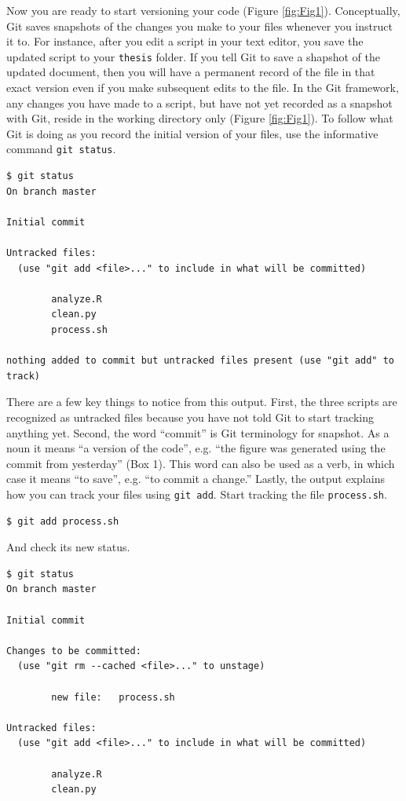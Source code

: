 \documentclass[10pt]{article}
\begin{document}
Now you are ready to start versioning your code (Figure \ref{fig:Fig1}).
Conceptually, Git saves snapshots of the changes you make to your files whenever you instruct it to.
For instance, after you edit a script in your text editor, you save the updated script to your \verb|thesis| folder.
If you tell Git to save a shapshot of the updated document, then you will have a permanent record of the file in that exact version even if you make subsequent edits to the file.
In the Git framework, any changes you have made to a script, but have not yet recorded as a snapshot with Git, reside in the working directory only (Figure \ref{fig:Fig1}).
To follow what Git is doing as you record the initial version of your files, use the informative command \verb|git status|.

\begin{verbatim}
$ git status
On branch master

Initial commit

Untracked files:
  (use "git add <file>..." to include in what will be committed)

        analyze.R
        clean.py
        process.sh

nothing added to commit but untracked files present (use "git add" to track)
\end{verbatim}

There are a few key things to notice from this output.
First, the three scripts are recognized as untracked files because you have not told Git to start tracking anything yet.
Second, the word ``commit'' is Git terminology for snapshot.
As a noun it means ``a version of the code'', e.g. ``the figure was generated using the commit from yesterday'' (Box 1).
This word can also be used as a verb, in which case it means ``to save'', e.g. ``to commit a change.''
Lastly, the output explains how you can track your files using \verb|git add|.
Start tracking the file \verb|process.sh|.

\begin{verbatim}
$ git add process.sh
\end{verbatim}

And check its new status.

\begin{verbatim}
$ git status
On branch master

Initial commit

Changes to be committed:
  (use "git rm --cached <file>..." to unstage)

        new file:   process.sh

Untracked files:
  (use "git add <file>..." to include in what will be committed)

        analyze.R
        clean.py
\end{verbatim}
\end{document}
